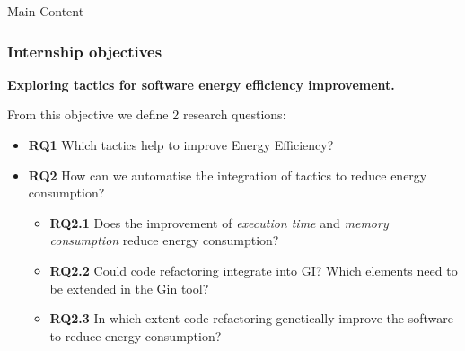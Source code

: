 \documentclass{beamer}
\begin{document}
\begin{frame}{Main Content}
  \frametitle{Internship objectives}
  \vspace{-1cm}
  \textbf{\footnotesize Exploring tactics for software energy efficiency improvement.} 
  
  \vspace{1em}
  
  \footnotesize From this objective we define 2 research questions:
  \begin{itemize}
    \item \footnotesize \textbf{RQ1} Which tactics help to improve Energy Efficiency?
    \item \footnotesize \textbf{RQ2} How can we automatise the integration of tactics to reduce energy consumption?
        \vspace{1em}
        \begin{itemize}
            \item \footnotesize \textbf{RQ2.1} Does the improvement of \textit{execution time} and  \textit{memory consumption} reduce energy consumption?
            \item \footnotesize \textbf{RQ2.2} Could code refactoring integrate into GI? Which elements need to be extended in the Gin tool?
            \item \footnotesize \textbf{RQ2.3} In which extent code refactoring genetically improve the software to reduce energy consumption?
      \end{itemize}
  \end{itemize}
\end{frame}
\end{document}
